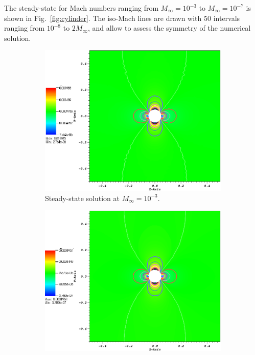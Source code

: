 \documentclass[preprint,10pt]{elsarticle}
\newcommand{\fig}[1]{Fig.~\ref{#1}}                      %
\begin{document}
The steady-state for Mach numbers ranging from $M_{\infty} = 10^{-3}$ to $M_{\infty} = 10^{-7}$ is shown in \fig{fig:cylinder}. The iso-Mach lines are drawn with $50$ intervals ranging from $10^{-8}$ to $2M_{\infty}$, and allow to assess the symmetry of the numerical solution.
\begin{figure}[H]
        \centering
        \begin{subfigure}[b]{0.495\textwidth}
                \centering
                \includegraphics[width=\textwidth]{CylinderMach1em3.png}
                \caption{Steady-state solution at $M_{\infty}=10^{-3}$.}
                \label{fig:cyl_1em3}
        \end{subfigure}%
        \begin{subfigure}[b]{0.495\textwidth}
                \centering
                \includegraphics[width=\textwidth]{CylinderMach1em4.png}

\end{subfigure}
\end{figure}
\end{document}
